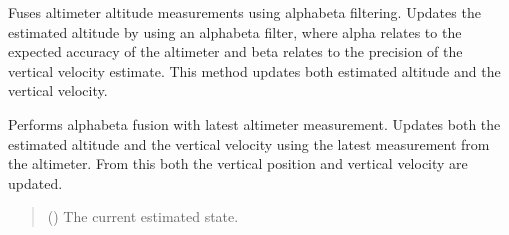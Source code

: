 \documentclass[letterpaper,10pt,english]{sphinxmanual}
\begin{document}
\begin{fulllineitems}
\label{\detokenize{modules/fusion/altimeter:qnav.fusion.altimeter.AlphaBetaAltimeter}}
\pysigstartsignatures
{}
\pysigstopsignatures
\sphinxAtStartPar
Fuses altimeter altitude measurements using alpha\sphinxhyphen{}beta filtering.
Updates the estimated altitude by using an alpha\sphinxhyphen{}beta filter, where alpha
relates to the expected accuracy of the altimeter and beta relates to the
precision of the vertical velocity estimate. This method updates both
estimated altitude and the vertical velocity.

\begin{fulllineitems}
\label{\detokenize{modules/fusion/altimeter:qnav.fusion.altimeter.AlphaBetaAltimeter.perform_fusion}}
\pysigstartsignatures
{}
\pysigstopsignatures
\sphinxAtStartPar
Performs alpha\sphinxhyphen{}beta fusion with latest altimeter measurement.
Updates both the estimated altitude and the vertical velocity using
the latest measurement from the altimeter. From this both the
vertical position and vertical velocity are updated.
\begin{quote}\begin{description}
\sphinxAtStartPar
{} ({\hyperref[\detokenize{modules/estimation/state:qnav.estimation.state.EstimatedState}]{}}) \textendash{} The current estimated state.


\end{description}
\end{quote}
\end{fulllineitems}
\end{fulllineitems}
\end{document}
